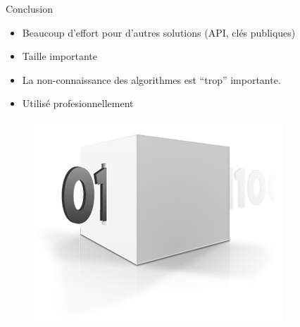 \documentclass{beamer}
\begin{document}
\begin{frame}{Conclusion}
  
  \begin{itemize}
  \item Beaucoup d'effort pour d'autres solutions (API, clés publiques)
  \item Taille importante
  \item La non-connaissance des algorithmes est ``trop'' importante.
  \item Utilisé profesionnellement
  \end{itemize}

  \begin{figure}[h]
    \centering
    \includegraphics[scale=0.6]{./images/conclusion.png}
  \end{figure}

\end{frame}
\end{document}
